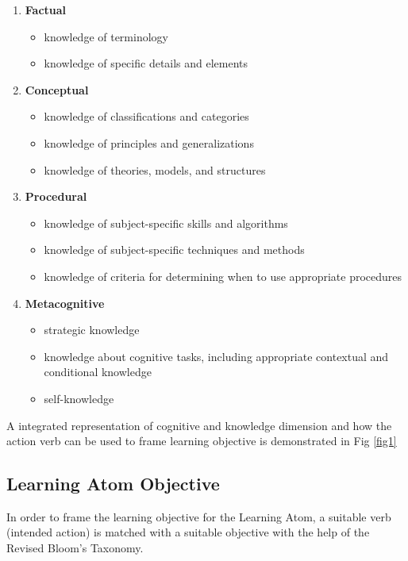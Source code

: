 \documentclass[]{article}
\begin{document}
\begin{enumerate}
  \item \textbf{Factual} 
    \begin{itemize}
      \item knowledge of terminology
      \item knowledge of specific details and elements
    \end{itemize}
  \item \textbf{Conceptual} 
    \begin{itemize}
      \item knowledge of classifications and categories
      \item knowledge of principles and generalizations
      \item knowledge of theories, models, and structures
    \end{itemize}  
  \item \textbf{Procedural}
    \begin{itemize}
      \item knowledge of subject-specific skills and algorithms
      \item knowledge of subject-specific techniques and methods
      \item knowledge of criteria for determining when to use appropriate procedures
    \end{itemize}
  \item \textbf{Metacognitive}
    \begin{itemize}
      \item strategic knowledge
      \item knowledge about cognitive tasks, including appropriate contextual and conditional knowledge
      \item self-knowledge
    \end{itemize}
\end{enumerate}


A integrated representation of cognitive and knowledge dimension and how the action verb can be used to frame learning objective is demonstrated in Fig \ref{fig1}

\subsection[Learning Atom]{Learning Atom Objective}  

In order to frame the learning objective for the Learning Atom, a suitable verb (intended action) is matched with a suitable objective with the help of the Revised Bloom's Taxonomy.
\end{document}
